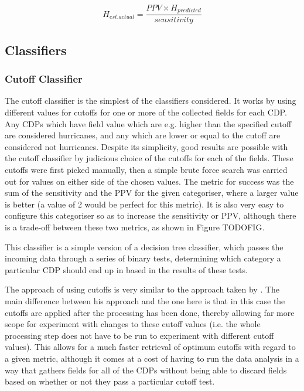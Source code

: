 \documentclass[pdftex,12pt,a4paper]{report}
\begin{document}
\begin{equation}
    H_{est. actual} = \frac{PPV \times H_{predicted}}{sensitivity}
    \label{eqn:n_actual_hurricane}
\end{equation}

\subsection{Classifiers}

\subsubsection{Cutoff Classifier}
The cutoff classifier is the simplest of the classifiers considered. It works by using different
values for cutoffs for one or more of the collected fields for each CDP. Any CDPs which have field
value which are e.g. higher than the specified cutoff are considered hurricanes, and any which are
lower or equal to the cutoff are considered not hurricanes. Despite its simplicity, good results are
possible with the cutoff classifier by judicious choice of the cutoffs for each of the fields. These
cutoffs were first picked manually, then a simple brute force search was carried out for values on
either side of the chosen values. The metric for success was the sum of the sensitivity and the PPV
for the given categoriser, where a larger value is better (a value of 2 would be perfect for this
metric). It is also very easy to configure this categoriser so as to increase the sensitivity or PPV,
although there is a trade-off between these two metrics, as shown in Figure TODOFIG.

This classifier is a simple version of a decision tree classifier, which passes the incoming data
through a series of binary tests, determining which category a particular CDP should end up in based
in the results of these tests.

The approach of using cutoffs is very similar to the approach taken by
\textcite{walshObjective1997}. The main difference between his approach and the one here is that in
this case the cutoffs are applied after the processing has been done, thereby allowing far more
scope for experiment with changes to these cutoff values (i.e. the whole processing step does not
have to be run to experiment with different cutoff values). This allows for a much faster retrieval
of optimum cutoffs with regard to a given metric, although it comes at a cost of having to run the
data analysis in a way that gathers fields for all of the CDPs without being able to discard fields
based on whether or not they pass a particular cutoff test.
\end{document}
